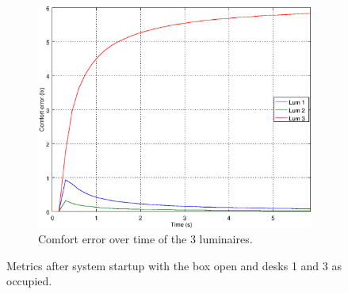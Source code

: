 \begin{figure}[ht]
\begin{subfigure}[t]{0.32\textwidth}
    \centering
    \includegraphics[width=.95\textwidth]{img/n_open_o101}
    \caption{Comfort error over time of the 3 luminaires.}
    \label{fig:n_open_o101}
    \end{subfigure}
    \caption{Metrics after system startup with the box open and desks 1 and 3 as occupied.}
\end{figure}


